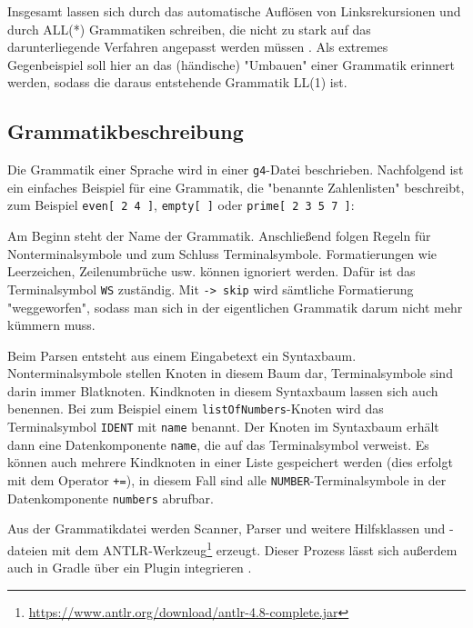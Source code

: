 

Insgesamt lassen sich durch das automatische Auflösen von Linksrekursionen und durch ALL(*) Grammatiken schreiben, die nicht zu stark auf das darunterliegende Verfahren angepasst werden müssen \cite{ANTLR4Reference}. Als extremes Gegenbeispiel soll hier an das (händische) "Umbauen" einer Grammatik erinnert werden, sodass die daraus entstehende Grammatik LL(1) ist.

\subsection{Grammatikbeschreibung}

Die Grammatik einer Sprache wird in einer \lstinline{g4}-Datei beschrieben. Nachfolgend ist ein einfaches Beispiel für eine Grammatik, die "benannte Zahlenlisten" beschreibt, zum Beispiel \lstinline{even[ 2 4 ]}, \lstinline{empty[ ]} oder \lstinline{prime[ 2 3 5 7 ]}:



Am Beginn steht der Name der Grammatik. Anschließend folgen Regeln für Nonterminalsymbole und zum Schluss Terminalsymbole. Formatierungen wie Leerzeichen, Zeilenumbrüche usw. können ignoriert werden. Dafür ist das Terminalsymbol \lstinline{WS} zuständig. Mit \lstinline{-> skip} wird sämtliche Formatierung "weggeworfen", sodass man sich in der eigentlichen Grammatik darum nicht mehr kümmern muss. 

Beim Parsen entsteht aus einem Eingabetext ein Syntaxbaum. Nonterminalsymbole stellen Knoten in diesem Baum dar, Terminalsymbole sind darin immer Blatknoten. Kindknoten in diesem Syntaxbaum lassen sich auch benennen. Bei zum Beispiel einem \lstinline{listOfNumbers}-Knoten wird das Terminalsymbol \lstinline{IDENT} mit \lstinline{name} benannt. Der Knoten im Syntaxbaum erhält dann eine Datenkomponente \lstinline{name}, die auf das Terminalsymbol verweist. Es können auch mehrere Kindknoten in einer Liste gespeichert werden (dies erfolgt mit dem Operator \lstinline{+=}), in diesem Fall sind alle \lstinline{NUMBER}-Terminalsymbole in der Datenkomponente \lstinline{numbers} abrufbar.

Aus der Grammatikdatei werden Scanner, Parser und weitere Hilfsklassen und -dateien mit dem ANTLR-Werkzeug\footnote{\url{https://www.antlr.org/download/antlr-4.8-complete.jar}} erzeugt. Dieser Prozess lässt sich außerdem auch in Gradle über ein Plugin integrieren \cite{GradleANTLRPlugin}.


